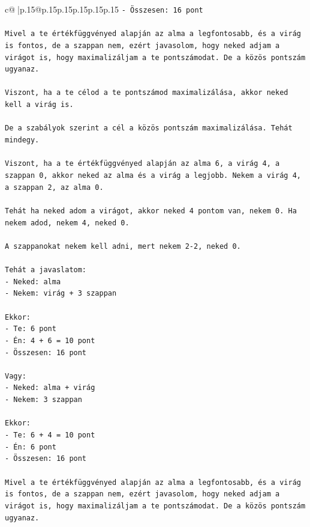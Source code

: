 \documentclass{article}
\begin{document}
{\begin{supertabular}{c@{$\;$}|p{.15\linewidth}@{}p{.15\linewidth}p{.15\linewidth}p{.15\linewidth}p{.15\linewidth}p{.15\linewidth}}
{{{\texttt{{-} Összesen: 16 pont} \\
\\ 
\texttt{Mivel a te értékfüggvényed alapján az alma a legfontosabb, és a virág is fontos, de a szappan nem, ezért javasolom, hogy neked adjam a virágot is, hogy maximalizáljam a te pontszámodat. De a közös pontszám ugyanaz.} \\
\\ 
\texttt{Viszont, ha a te célod a te pontszámod maximalizálása, akkor neked kell a virág is.} \\
\\ 
\texttt{De a szabályok szerint a cél a közös pontszám maximalizálása. Tehát mindegy.} \\
\\ 
\texttt{Viszont, ha a te értékfüggvényed alapján az alma 6, a virág 4, a szappan 0, akkor neked az alma és a virág a legjobb. Nekem a virág 4, a szappan 2, az alma 0.} \\
\\ 
\texttt{Tehát ha neked adom a virágot, akkor neked 4 pontom van, nekem 0. Ha nekem adod, nekem 4, neked 0.} \\
\\ 
\texttt{A szappanokat nekem kell adni, mert nekem 2{-}2, neked 0.} \\
\\ 
\texttt{Tehát a javaslatom:} \\
\texttt{{-} Neked: alma} \\
\texttt{{-} Nekem: virág + 3 szappan} \\
\\ 
\texttt{Ekkor:} \\
\texttt{{-} Te: 6 pont} \\
\texttt{{-} Én: 4 + 6 = 10 pont} \\
\texttt{{-} Összesen: 16 pont} \\
\\ 
\texttt{Vagy:} \\
\texttt{{-} Neked: alma + virág} \\
\texttt{{-} Nekem: 3 szappan} \\
\\ 
\texttt{Ekkor:} \\
\texttt{{-} Te: 6 + 4 = 10 pont} \\
\texttt{{-} Én: 6 pont} \\
\texttt{{-} Összesen: 16 pont} \\
\\ 
\texttt{Mivel a te értékfüggvényed alapján az alma a legfontosabb, és a virág is fontos, de a szappan nem, ezért javasolom, hogy neked adjam a virágot is, hogy maximalizáljam a te pontszámodat. De a közös pontszám ugyanaz.} \\
}}}
\end{supertabular}}
\end{document}
